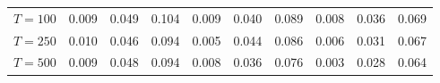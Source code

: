 % 
\begin{tabular}{cccccccccc}
  \hline
  \hline
$T = 100$ & 0.009 & 0.049 & 0.104 & 0.009 & 0.040 & 0.089 & 0.008 & 0.036 & 0.069 \\ 
  $T = 250$ & 0.010 & 0.046 & 0.094 & 0.005 & 0.044 & 0.086 & 0.006 & 0.031 & 0.067 \\ 
  $T = 500$ & 0.009 & 0.048 & 0.094 & 0.008 & 0.036 & 0.076 & 0.003 & 0.028 & 0.064 \\ 
   \hline
\end{tabular}
